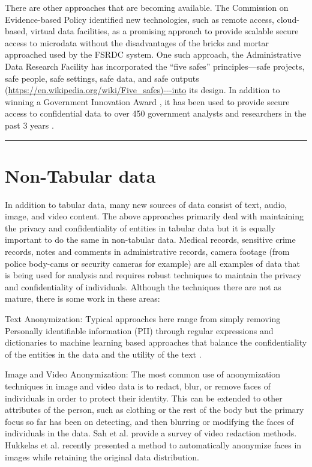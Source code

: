 \documentclass[]{krantz}
\begin{document}
There are other approaches that are becoming available. The Commission
on Evidence-based Policy identified new technologies, such as remote
access, cloud-based, virtual data facilities, as a promising approach to
provide scalable secure access to microdata without the disadvantages of
the bricks and mortar approached used by the FSRDC system. One such
approach, the Administrative Data Research Facility has incorporated the
``five safes'' principles---safe projects, safe people, safe settings,
safe data, and safe outputs
(\url{https://en.wikipedia.org/wiki/Five_safes)---into} its design. In
addition to winning a Government Innovation Award
\citep{GovernmentComputerNewsStaff2018}, it has been used to provide
secure access to confidential data to over 450 government analysts and
researchers in the past 3 years \citep{Kreuter2019Change}.

\begin{center}\rule{0.5\linewidth}{\linethickness}\end{center}

\section{Non-Tabular data}\label{non-tabular-data}

In addition to tabular data, many new sources of data consist of text,
audio, image, and video content. The above approaches primarily deal
with maintaining the privacy and confidentiality of entities in tabular
data but it is equally important to do the same in non-tabular data.
Medical records, sensitive crime records, notes and comments in
administrative records, camera footage (from police body-cams or
security cameras for example) are all examples of data that is being
used for analysis and requires robust techniques to maintain the privacy
and confidentiality of individuals. Although the techniques there are
not as mature, there is some work in these areas:

Text Anonymization: Typical approaches here range from simply removing
Personally identifiable information (PII) through regular expressions
and dictionaries \citep{Neamatullah2008} to machine learning based
approaches that balance the confidentiality of the entities in the data
and the utility of the text \citep{Cumby2011}.

Image and Video Anonymization: The most common use of anonymization
techniques in image and video data is to redact, blur, or remove faces
of individuals in order to protect their identity. This can be extended
to other attributes of the person, such as clothing or the rest of the
body but the primary focus so far has been on detecting, and then
blurring or modifying the faces of individuals in the data. Sah et al.
\citeyearpar{Sah2017} provide a survey of video redaction methods.
Hukkelas et al. \citeyearpar{Hukkelas2019} recently presented a method
to automatically anonymize faces in images while retaining the original
data distribution.
\end{document}
